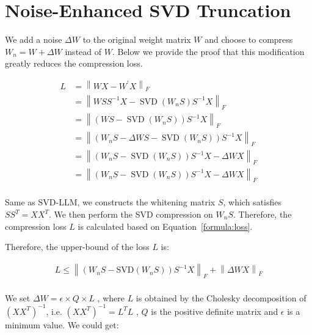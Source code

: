\section{Noise-Enhanced SVD Truncation}
We add a noise {\small$\Delta W$} to the original weight matrix {\small$W$} and choose to compress {\small$W_n = W + \Delta W$} instead of {\small$W$}. Below we provide the proof that this modification greatly reduces the compression loss.

\vspace{-2mm}
{\small
\begin{equation}
\begin{split}
     L&=\left\|W X-W^{\prime} X\right\|_F\\
    &=\left\|W S S^{-1} X-\operatorname{SVD}(W_n S) S^{-1} X\right\|_F\\
    &=\left\|(W S-\operatorname{SVD}(W_n S)) S^{-1} X\right\|_F\\
    &=\left\|(W_n S -\Delta W S-\operatorname{SVD}(W_n S)) S^{-1} X\right\|_F\\
    &=\left\|(W_n S -\operatorname{SVD}(W_n S)) S^{-1} X - \Delta WX\right\|_F\\
    &=\left\|(W_n S -\operatorname{SVD}(W_n S)) S^{-1} X - \Delta WX\right\|_F\\
\end{split}
\label{formula:loss}
\end{equation}
}

\noindent Same as SVD-LLM, we constructs the whitening matrix {\small$S$}, which satisfies {\small$SS^T = XX^T$}. We then perform the SVD compression on {\small$W_nS$}. Therefore, the compression loss {\small$L$} is calculated based on Equation~\ref{formula:loss}.

\noindent Therefore, the upper-bound of the loss $L$ is:

\vspace{-2mm}
{\small
\begin{equation}
\begin{split}
     L \leq \left\|(W_n S -\text{SVD}(W_n S)) S^{-1} X\right\|_F + \left\|\Delta WX\right\|_F\\
\end{split}
\label{formula:deduct}
\end{equation}
}

\noindent We set {\small $\Delta W = \epsilon \times Q\times L$} , where {\small $L$} is obtained by the Cholesky decomposition of {\small $(XX^T)^{-1}$}, i.e. {\small$(XX^T)^{-1} = L^TL$ }, {\small $Q$} is the positive definite matrix and $\epsilon$ is a minimum value. We could get:

